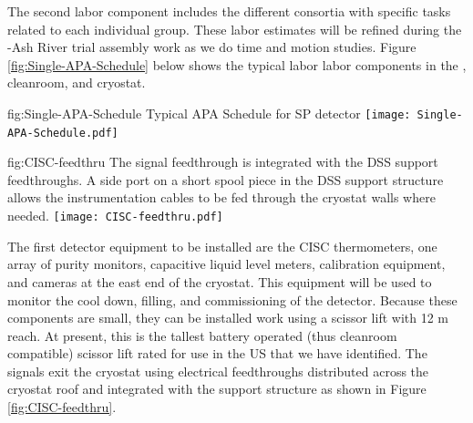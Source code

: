 The second labor component includes the different consortia with specific tasks related to each individual group. These labor estimates will be refined during the -Ash River trial assembly work as we do time and motion studies. Figure \ref{fig:Single-APA-Schedule} below shows the typical labor labor components in the , cleanroom, and cryostat. 

\begin{dunefigure}
{fig:Single-APA-Schedule}
{Typical APA Schedule for SP detector}
\texttt{[image: Single-APA-Schedule.pdf]}
\end{dunefigure}

\begin{dunefigure}{fig:CISC-feedthru}
{The signal feedthrough is integrated with the DSS support feedthroughs. A side port on a short spool piece in the DSS support structure allows the instrumentation cables to be fed through the cryostat walls where needed.}
\texttt{[image: CISC-feedthru.pdf]}
\end{dunefigure}



The first detector equipment to be installed are the CISC thermometers, one array of purity monitors, capacitive liquid level meters, calibration equipment, and cameras at the east end of the cryostat. 
This equipment will be used to monitor the cool down, filling, and commissioning of the detector. Because these components are small, they can be installed work using a scissor lift with 12 \si{m} reach. 
At present, this is the tallest battery operated (thus cleanroom compatible) scissor lift rated for use in the US that we have identified. The signals exit the cryostat using electrical feedthroughs distributed across the cryostat roof and integrated with the  support structure as shown in Figure \ref{fig:CISC-feedthru}.

